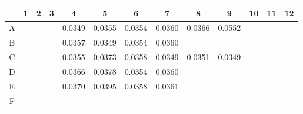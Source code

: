 \documentclass[UTF8,10pt,a4paper,fontset=fandol]{ctexart}
\renewcommand{\arraystretch}{1.15}
\newcommand{\fieldvalue}[1]{#1}
\begin{document}
\begin{center}
\scriptsize
\renewcommand{\arraystretch}{1.55}
\begin{tabular}{c|c|c|c|c|c|c|c|c|c|c|c|c}
 &1&2&3&4&5&6&7&8&9&10&11&12\\ \hline
A&&&&
\fieldvalue{0.0349}&
\fieldvalue{0.0355}&
\fieldvalue{0.0354}&
\fieldvalue{0.0360}&
\fieldvalue{0.0366}&
\fieldvalue{0.0552}&\\ \hline
B&&&&
\fieldvalue{0.0357}&
\fieldvalue{0.0349}&
\fieldvalue{0.0354}&
\fieldvalue{0.0360}&&&\\ \hline
C&&&&
\fieldvalue{0.0355}&
\fieldvalue{0.0373}&
\fieldvalue{0.0358}&
\fieldvalue{0.0349}&
\fieldvalue{0.0351}&
\fieldvalue{0.0349}&\\ \hline
D&&&&
\fieldvalue{0.0366}&
\fieldvalue{0.0378}&
\fieldvalue{0.0354}&
\fieldvalue{0.0360}&&&\\ \hline
E&&&&
\fieldvalue{0.0370}&
\fieldvalue{0.0395}&
\fieldvalue{0.0358}&
\fieldvalue{0.0361}&&&\\ \hline
F&&&&

\end{tabular}
\end{center}
\end{document}
